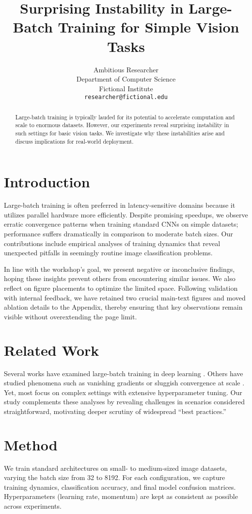 \documentclass{article}
\title{Surprising Instability in Large-Batch Training for Simple Vision Tasks}
\author{
  Ambitious Researcher \\
  Department of Computer Science \\
  Fictional Institute \\
  \texttt{researcher@fictional.edu}
}
\begin{document}
\maketitle

\begin{abstract}
Large-batch training is typically lauded for its potential to accelerate computation and scale to enormous datasets. However, our experiments reveal surprising instability in such settings for basic vision tasks. We investigate why these instabilities arise and discuss implications for real-world deployment.
\end{abstract}

\section{Introduction}
Large-batch training is often preferred in latency-sensitive domains because it utilizes parallel hardware more efficiently. Despite promising speedups, we observe erratic convergence patterns when training standard CNNs on simple datasets; performance suffers dramatically in comparison to moderate batch sizes. Our contributions include empirical analyses of training dynamics that reveal unexpected pitfalls in seemingly routine image classification problems.

In line with the workshop's goal, we present negative or inconclusive findings, hoping these insights prevent others from encountering similar issues. We also reflect on figure placements to optimize the limited space. Following validation with internal feedback, we have retained two crucial main-text figures and moved ablation details to the Appendix, thereby ensuring that key observations remain visible without overextending the page limit.

\section{Related Work}
Several works have examined large-batch training in deep learning \citep{krizhevsky2012imagenet}. Others have studied phenomena such as vanishing gradients or sluggish convergence at scale \citep{he2016deep}. Yet, most focus on complex settings with extensive hyperparameter tuning. Our study complements these analyses by revealing challenges in scenarios considered straightforward, motivating deeper scrutiny of widespread “best practices.”

\section{Method}
We train standard architectures on small- to medium-sized image datasets, varying the batch size from 32 to 8192. For each configuration, we capture training dynamics, classification accuracy, and final model confusion matrices. Hyperparameters (learning rate, momentum) are kept as consistent as possible across experiments.
\end{document}
